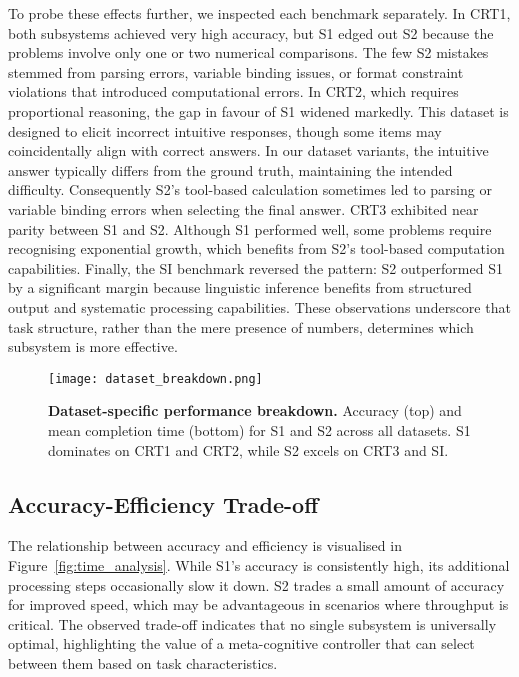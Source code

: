 \documentclass[11pt]{article}
\begin{document}
To probe these effects further, we inspected each benchmark separately.
In CRT1, both subsystems achieved very high accuracy, but S1 edged out
S2 because the problems involve only one or two numerical comparisons.
The few S2 mistakes stemmed from parsing errors, variable binding issues, or format constraint violations that
introduced computational errors.  In CRT2, which requires proportional
reasoning, the gap in favour of S1 widened markedly.  This dataset
is designed to elicit incorrect intuitive responses, though some items may coincidentally align with correct answers.
In our dataset variants, the intuitive answer typically differs from the ground truth, maintaining the intended difficulty.
Consequently S2's tool-based calculation sometimes led to parsing or variable binding errors when selecting the final
answer.  CRT3 exhibited near parity between S1 and S2.  Although S1
performed well, some problems require recognising exponential growth,
which benefits from S2's tool-based computation capabilities.  Finally, the SI
benchmark reversed the pattern: S2 outperformed S1 by a significant
margin because linguistic inference benefits from structured output
and systematic processing capabilities.
These observations underscore that task structure, rather
than the mere presence of numbers, determines which subsystem is more
effective.

\begin{figure}[t]
  \centering
  \texttt{[image: dataset\_breakdown.png]}
  \caption{\textbf{Dataset-specific performance breakdown.}
    Accuracy (top) and mean completion time (bottom) for S1 and S2 across all datasets.
    S1 dominates on CRT1 and CRT2, while S2 excels on CRT3 and SI.}
  \label{fig:dataset_breakdown}
\end{figure}
\FloatBarrier

\subsection{Accuracy-Efficiency Trade-off}
The relationship between accuracy and efficiency is visualised in
Figure~\ref{fig:time_analysis}.  While S1's accuracy is consistently high,
its additional processing steps occasionally slow it down.  S2 trades a small
amount of accuracy for improved speed, which may be advantageous in
scenarios where throughput is critical.  The observed trade-off indicates
that no single subsystem is universally optimal, highlighting the value of
a meta-cognitive controller that can select between them based on task characteristics.
\end{document}
